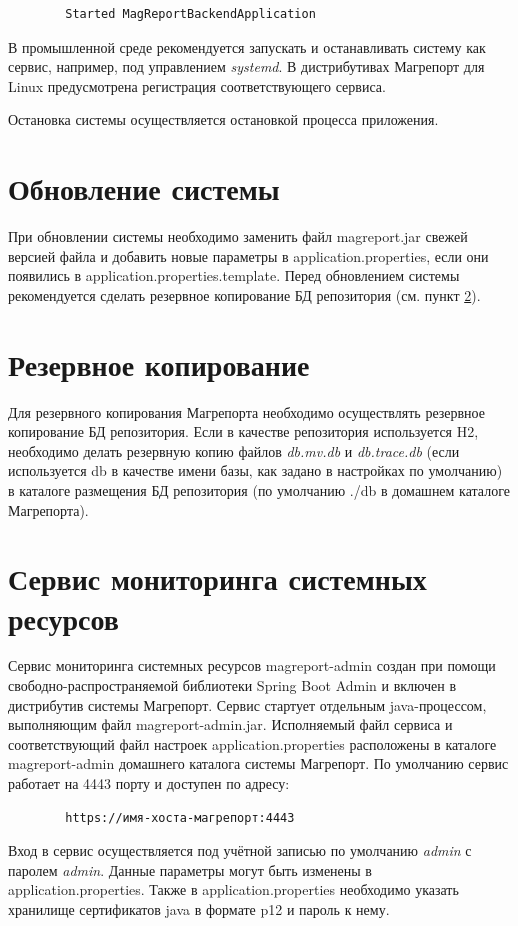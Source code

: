 \documentclass[../user-manual.tex]{subfiles}
\begin{document}
	\begin{lstlisting}
		Started MagReportBackendApplication
	\end{lstlisting}

	В промышленной среде рекомендуется запускать и останавливать систему как сервис, например, под управлением \textit{systemd}. В дистрибутивах Магрепорт для Linux предусмотрена регистрация соответствующего сервиса.
	
	Остановка системы осуществляется остановкой процесса приложения.
	
	\section{Обновление системы}\label{section:upgrade}
	
	При обновлении системы необходимо заменить файл magreport.jar свежей версией файла и добавить новые параметры в application.properties, если они появились в application.properties.template. Перед обновлением системы рекомендуется сделать резервное копирование БД репозитория (см. пункт \ref{section:backup}).
	
	\section{Резервное копирование}\label{section:backup}
	
	Для резервного копирования Магрепорта необходимо осуществлять резервное копирование БД репозитория. Если в качестве репозитория используется H2, необходимо делать резервную копию файлов \textit{db.mv.db} и \textit{db.trace.db} (если используется db в качестве имени базы, как задано в настройках по умолчанию) в каталоге размещения БД репозитория (по умолчанию ./db в домашнем каталоге Магрепорта).
	
	\section{Сервис мониторинга системных ресурсов}
	
	Сервис мониторинга системных ресурсов magreport-admin создан при помощи свободно-распространяемой библиотеки Spring Boot Admin и включен в дистрибутив системы Магрепорт. Сервис стартует отдельным java-процессом, выполняющим файл magreport-admin.jar. Исполняемый файл сервиса и соответствующий файл настроек application.properties расположены в каталоге magreport-admin домашнего каталога системы Магрепорт. По умолчанию сервис работает на 4443 порту и доступен по адресу:
	\begin{verbatim}
		https://имя-хоста-магрепорт:4443
	\end{verbatim}
	Вход в сервис осуществляется под учётной записью по умолчанию \textit{admin} с паролем \textit{admin}. Данные параметры могут быть изменены в application.properties. Также в application.properties необходимо указать хранилище сертификатов java в формате p12 и пароль к нему.
	
\end{document}

